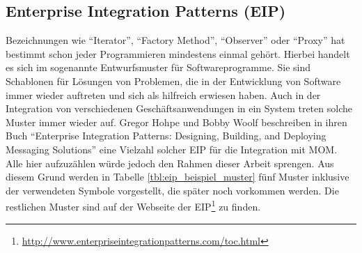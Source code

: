 
\subsection{Enterprise Integration Patterns (EIP)} %
\label{sub:enterprise_integration_pattern}

Bezeichnungen wie \enquote{Iterator}, \enquote{Factory Method}, \enquote{Observer} oder \enquote{Proxy} hat bestimmt schon jeder Programmieren mindestens einmal gehört. Hierbei handelt es sich im sogenannte Entwurfsmuster für Softwareprogramme. Sie sind Schablonen für Lösungen von Problemen, die in der Entwicklung von Software immer wieder auftreten und sich als hilfreich erwiesen haben. Auch in der Integration von verschiedenen Geschäftsanwendungen in ein System treten solche Muster immer wieder auf. Gregor Hohpe und Bobby Woolf beschreiben in ihren Buch \enquote{Enterprise Integration Patterns: Designing, Building, and Deploying Messaging Solutions}\cite{Hohpe:2003:EIP:940308} eine Vielzahl solcher EIP für die Integration mit MOM. Alle hier aufzuzählen würde jedoch den Rahmen dieser Arbeit sprengen. Aus diesem Grund werden in Tabelle \ref{tbl:eip_beispiel_muster} fünf Muster inklusive der verwendeten Symbole vorgestellt, die später noch vorkommen werden. Die restlichen Muster sind auf der Webseite der EIP\footnote{\url{http://www.enterpriseintegrationpatterns.com/toc.html}} zu finden.

